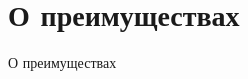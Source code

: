 \section{О преимуществах}

\begin{frame}
    \begin{center}\Huge 
    О преимуществах
    \end{center}
\end{frame}
